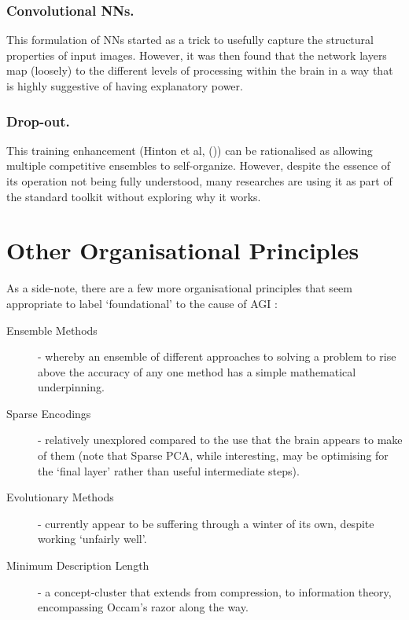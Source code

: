 \documentclass[citeauthoryear]{llncs}
\begin{document}
\subsubsection*{Convolutional NNs.}
This formulation of NNs started as a trick to usefully capture 
the structural properties of input images.  
However, it was then found that the network layers map (loosely) 
to the different levels of processing within the brain in a way that is highly suggestive 
of having explanatory power.

\subsubsection*{Drop-out.}
This training enhancement (Hinton et al, (\cite{hinton-dropout})) 
can be rationalised as allowing multiple competitive ensembles to self-organize.  
However, despite the essence of its operation not being fully understood, 
many researches are using it as part of the standard toolkit without 
exploring why it works.


\section{Other Organisational Principles}

As a side-note, there are a few more organisational principles that seem appropriate 
to label `foundational' to the cause of AGI :
\begin{description}
\item[Ensemble Methods] - whereby an ensemble of different approaches to 
solving a problem to rise above the accuracy 
of any one method has a simple mathematical underpinning.  
\item[Sparse Encodings] - relatively unexplored compared to the use that 
the brain appears to make of them (note that Sparse PCA, while interesting, 
may be optimising for the `final layer' rather than useful intermediate steps).
\item[Evolutionary Methods] - currently appear to be suffering through 
a winter of its own, despite working `unfairly well'.
\item[Minimum Description Length] - a concept-cluster that extends from compression, 
to information theory, encompassing Occam's razor along the way.
\end{description}

\end{document}
